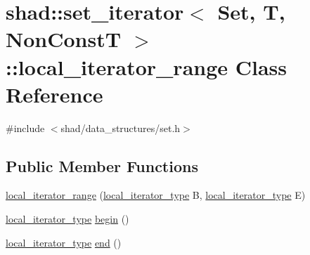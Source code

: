 \hypertarget{classshad_1_1set__iterator_1_1local__iterator__range}{\section{shad\-:\-:set\-\_\-iterator$<$ Set, T, Non\-Const\-T $>$\-:\-:local\-\_\-iterator\-\_\-range Class Reference}
\label{classshad_1_1set__iterator_1_1local__iterator__range}
}


{\ttfamily \#include $<$shad/data\-\_\-structures/set.\-h$>$}

\subsection*{Public Member Functions}
\begin{DoxyCompactItemize}
\item 
\hyperlink{classshad_1_1set__iterator_1_1local__iterator__range_af189c5cf8a31e4a83ec0fbeb1703c842}{local\-\_\-iterator\-\_\-range} (\hyperlink{classshad_1_1set__iterator_a162b1b9d8dfe2e3a656fcdacf0450939}{local\-\_\-iterator\-\_\-type} B, \hyperlink{classshad_1_1set__iterator_a162b1b9d8dfe2e3a656fcdacf0450939}{local\-\_\-iterator\-\_\-type} E)
\item 
\hyperlink{classshad_1_1set__iterator_a162b1b9d8dfe2e3a656fcdacf0450939}{local\-\_\-iterator\-\_\-type} \hyperlink{classshad_1_1set__iterator_1_1local__iterator__range_a0e96506acd3dc4c0cf4fa4588aa93d82}{begin} ()
\item 
\hyperlink{classshad_1_1set__iterator_a162b1b9d8dfe2e3a656fcdacf0450939}{local\-\_\-iterator\-\_\-type} \hyperlink{classshad_1_1set__iterator_1_1local__iterator__range_aacd5fc78ecf1281f2c31edf63c0defce}{end} ()
\end{DoxyCompactItemize}


